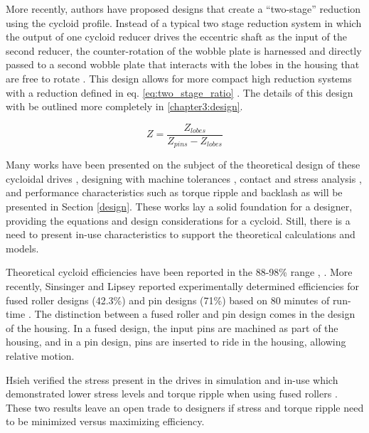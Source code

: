 More recently, authors have proposed designs that create a ``two-stage'' reduction using the cycloid profile. Instead of a typical two stage reduction system in which the output of one cycloid reducer drives the eccentric shaft as the input of the second reducer, the counter-rotation of the wobble plate is harnessed and directly passed to a second wobble plate that interacts with the lobes in the housing that are free to rotate \cite{ref:new_two_stage}. This design allows for more compact high reduction systems with a reduction defined in eq. \ref{eq:two_stage_ratio} \cite{ref:two_stage_tooth_mod}. The details of this design with be outlined more completely in \ref{chapter3:design}.

\begin{equation} \label{eq:single_stage_ratio}
Z = \frac{Z_{lobes}} {Z_{pins} - Z_{lobes}}
\end{equation}

Many works have been presented on the subject of the theoretical design of these cycloidal drives \cite{ref:on_the_lobe} \cite{ref:hwang_hsieh}, designing with machine tolerances \cite{ref:design_and_application}, contact and stress analysis \cite{ref:li}, and performance characteristics such as torque ripple and backlash \cite{ref:hsieh_traditional} \cite{ref:hsieh_dynamics} as will be presented in Section \ref{design}.
These works lay a solid foundation for a designer, providing the equations and design considerations for a cycloid.
Still, there is a need to present in-use characteristics to support the theoretical calculations and models.

Theoretical cycloid efficiencies have been reported in the 88-98\% range \cite{ref:Malhorta}, \cite{ref:unified_approach}.
More recently, Sinsinger and Lipsey reported experimentally determined efficiencies for fused roller designs (42.3\%) and pin designs (71\%) based on 80 minutes of run-time \cite{ref:cycloid_vs_harmonic}.
The distinction between a fused roller and pin design comes in the design of the housing.
In a fused design, the input pins are machined as part of the housing, and in a pin design, pins are inserted to ride in the housing, allowing relative motion.

Hsieh verified the stress present in the drives in simulation and in-use which demonstrated lower stress levels and torque ripple when using fused rollers \cite{ref:hsieh_dynamics}.
These two results leave an open trade to designers if stress and torque ripple need to be minimized versus maximizing efficiency.

